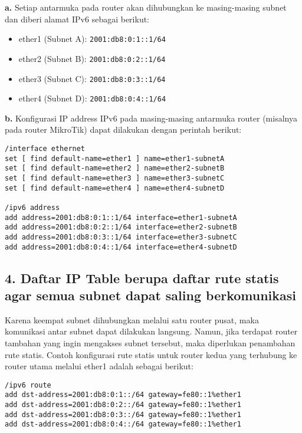\textbf{a.} Setiap antarmuka pada router akan dihubungkan ke masing-masing subnet dan diberi alamat IPv6 sebagai berikut:
\begin{itemize}
    \item ether1 (Subnet A): \texttt{2001:db8:0:1::1/64}
    \item ether2 (Subnet B): \texttt{2001:db8:0:2::1/64}
    \item ether3 (Subnet C): \texttt{2001:db8:0:3::1/64}
    \item ether4 (Subnet D): \texttt{2001:db8:0:4::1/64}
\end{itemize}

\textbf{b.} Konfigurasi IP address IPv6 pada masing-masing antarmuka router (misalnya pada router MikroTik) dapat dilakukan dengan perintah berikut:

\begin{verbatim}
/interface ethernet
set [ find default-name=ether1 ] name=ether1-subnetA
set [ find default-name=ether2 ] name=ether2-subnetB
set [ find default-name=ether3 ] name=ether3-subnetC
set [ find default-name=ether4 ] name=ether4-subnetD

/ipv6 address
add address=2001:db8:0:1::1/64 interface=ether1-subnetA
add address=2001:db8:0:2::1/64 interface=ether2-subnetB
add address=2001:db8:0:3::1/64 interface=ether3-subnetC
add address=2001:db8:0:4::1/64 interface=ether4-subnetD
\end{verbatim}

\subsection*{4. Daftar IP Table berupa daftar rute statis agar semua subnet dapat saling berkomunikasi}

Karena keempat subnet dihubungkan melalui satu router pusat, maka komunikasi antar subnet dapat dilakukan langsung. Namun, jika terdapat router tambahan yang ingin mengakses subnet tersebut, maka diperlukan penambahan rute statis. Contoh konfigurasi rute statis untuk router kedua yang terhubung ke router utama melalui ether1 adalah sebagai berikut:

\begin{verbatim}
/ipv6 route
add dst-address=2001:db8:0:1::/64 gateway=fe80::1%ether1
add dst-address=2001:db8:0:2::/64 gateway=fe80::1%ether1
add dst-address=2001:db8:0:3::/64 gateway=fe80::1%ether1
add dst-address=2001:db8:0:4::/64 gateway=fe80::1%ether1
\end{verbatim}

